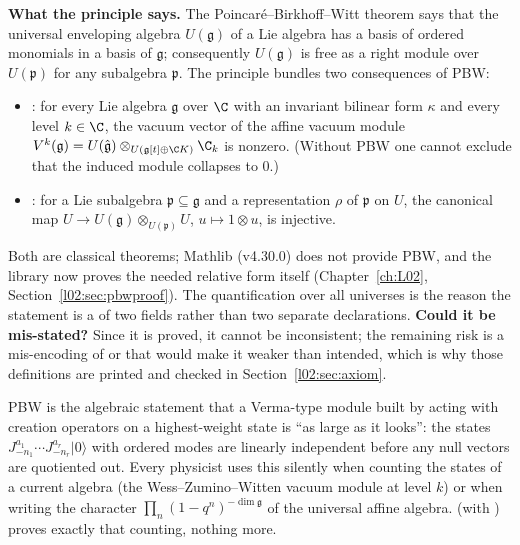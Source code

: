 \begin{dictionary}
\textbf{What the principle says.} The Poincar\'e--Birkhoff--Witt theorem says that the universal
enveloping algebra $U(\mathfrak g)$ of a Lie algebra has a basis of ordered monomials in a basis of
$\mathfrak g$; consequently $U(\mathfrak g)$ is free as a right module over $U(\mathfrak p)$ for any
subalgebra $\mathfrak p$. The principle bundles two consequences of PBW:
\begin{itemize}
\item {}: for every Lie algebra $\mathfrak g$ over $\C$ with an invariant
  bilinear form $\kappa$ and every level $k\in\C$, the vacuum vector of the affine vacuum module
  $V^k(\mathfrak g)=U(\hat{\mathfrak g})\otimes_{U(\mathfrak g[t]\oplus\C K)}\C_k$ is nonzero.
  (Without PBW one cannot exclude that the induced module collapses to $0$.)
\item {}: for a Lie subalgebra $\mathfrak p\subseteq\mathfrak g$ and a
  representation $\rho$ of $\mathfrak p$ on $U$, the canonical map
  $U\to U(\mathfrak g)\otimes_{U(\mathfrak p)}U$, $u\mapsto 1\otimes u$, is injective.
\end{itemize}
Both are classical theorems; Mathlib (v4.30.0) does not provide PBW, and the library now proves
the needed relative form itself (Chapter~\ref{ch:L02}, Section~\ref{l02:sec:pbwproof}). The
quantification over all universes  is the
reason the statement is a  of two fields rather than two separate declarations.
\textbf{Could it be mis-stated?} Since it is proved, it cannot be inconsistent; the remaining
risk is a mis-encoding of  or  that would make it
weaker than intended, which is why
those definitions are printed and checked in Section~\ref{l02:sec:axiom}.
\end{dictionary}

\begin{physics}
PBW is the algebraic statement that a Verma-type module built by acting with creation operators on
a highest-weight state is ``as large as it looks'': the states
$J^{a_1}_{-n_1}\cdots J^{a_r}_{-n_r}|0\rangle$ with ordered modes are linearly independent before any
null vectors are quotiented out. Every physicist uses this silently when counting the states of a
current algebra (the Wess--Zumino--Witten vacuum module at level $k$) or when writing the character
$\prod_n(1-q^n)^{-\dim\mathfrak g}$ of the universal affine algebra.  (with ) proves exactly
that counting, nothing more.
\end{physics}

